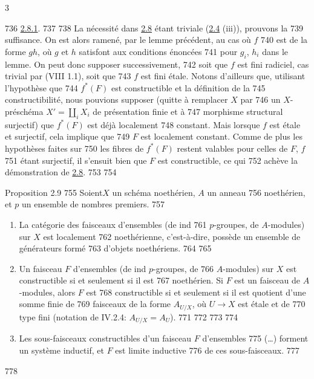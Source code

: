 3	\documentclass[10pt]{../fichiers-configuration-latex/smfart}
\begin{document}
   736	\hyperref[IX.lem2.8.1]{2.8.1}.
   737	
   738	La nécessité dans \hyperref[IX.prop2.8]{2.8} étant triviale (\hyperref[IX.prop2.4]{2.4} (iii)), prouvons la
   739	suffisance. On est alors ramené, par le lemme précédent, au cas où $f$
   740	est de la forme $gh$, où $g$ et $h$ satisfont aux conditions énoncées
   741	pour $g_i$, $h_i$ dans le lemme. On peut donc supposer successivement,
   742	soit que $f$ est fini radiciel, cas trivial par (VIII 1.1), soit que
   743	$f$ est fini étale. Notons d'ailleurs que, utilisant l'hypothèse que
   744	$f^{\ast}(F)$ est constructible et la définition de la
   745	constructibilité, nous pouvions supposer (quitte à remplacer $X$ par
   746	un $X$-préschéma $X'=\coprod_i X_i$ de présentation finie et à
   747	morphisme structural surjectif) que $f^{\ast}(F)$ est déjà localement
   748	constant. Mais lorsque $f$ est étale et surjectif, cela implique que
   749	$F$ est localement constant. Comme de plus les hypothèses faites sur
   750	les fibres de $f^{\ast}(F)$ restent valables pour celles de $F$, $f$
   751	étant surjectif, il s'ensuit bien que $F$ est constructible, ce qui
   752	achève la démonstration de \hyperref[IX.prop2.8]{2.8}.
   753	
   754	\begin{enonce*}{Proposition 2.9}
   755	Soient\pageoriginale $X$ un schéma noethérien, $A$ un anneau
   756	noethérien, et $p$ un ensemble de nombres premiers.
   757	\begin{enumerate}
   758	\renewcommand{\theenumi}{\roman{enumi}}
   759	\renewcommand{\labelenumi}{(\theenumi)}
   760	\item La catégorie des faisceaux d'ensembles (\resp de ind
   761	$p$-groupes, \resp de $A$-modules) sur $X$ est localement
   762	noethérienne, c'est-à-dire, possède un ensemble de générateurs formé
   763	d'objets noethériens.
   764	
   765	\item Un faisceau $F$ d'ensembles (\resp de ind $p$-groupes, \resp de
   766	$A$-modules) sur $X$ est constructible si et seulement si il est
   767	noethérien. Si $F$ est un faisceau de $A$-modules, alors $F$ est
   768	constructible si et seulement si il est quotient d'une somme finie de
   769	faisceaux de la forme $A_{U/X}$, où $U\rightarrow X$ est étale et de
   770	type fini (notation de {\rm IV.2.4}: $A_{U/X}=A_U$).
   771	
   772	%
   773	
   774	\item Les sous-faisceaux constructibles d'un faisceau $F$ d'ensembles
   775	(\resp\ldots) forment un système inductif, et $F$ est limite inductive
   776	de ces sous-faisceaux.
   777	\end{enumerate}
   778	\end{enonce*}
\end{document}
